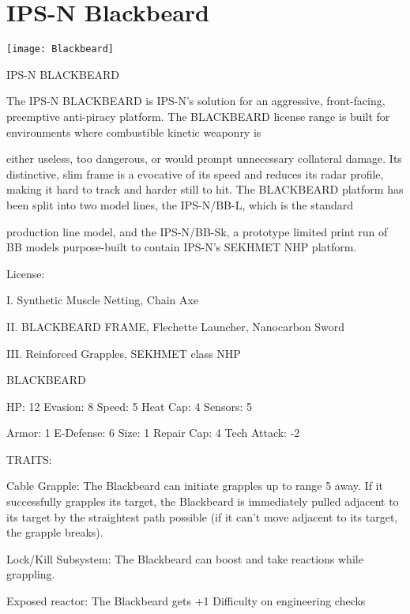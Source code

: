 \section{IPS-N Blackbeard}

\centering\texttt{[image: Blackbeard]}


                                         IPS-N BLACKBEARD


The IPS-N BLACKBEARD is IPS-N’s solution for an aggressive, front-facing, preemptive anti-piracy
platform. The BLACKBEARD license range is built for environments where combustible kinetic weaponry is

either useless, too dangerous, or would prompt unnecessary collateral damage. Its distinctive, slim frame is
a evocative of its speed and reduces its radar profile, making it hard to track and harder still to hit. The
BLACKBEARD platform has been split into two model lines, the IPS-N/BB-L, which is the standard

production line model, and the IPS-N/BB-Sk, a prototype limited print run of BB models purpose-built to
contain IPS-N’s SEKHMET NHP platform.

                                                     License:

I. Synthetic Muscle Netting, Chain Axe

II. BLACKBEARD FRAME, Flechette Launcher, Nanocarbon Sword

III. Reinforced Grapples, SEKHMET class NHP


                                                BLACKBEARD

  HP: 12          Evasion: 8                             Speed: 5            Heat Cap: 4        Sensors: 5

  Armor: 1        E-Defense: 6                           Size: 1             Repair Cap: 4      Tech Attack: -2

                                                     TRAITS:

  Cable Grapple: The Blackbeard can initiate grapples up to range 5 away. If it successfully grapples its
  target, the Blackbeard is immediately pulled adjacent to its target by the straightest path possible (if it
  can’t move adjacent to its target, the grapple breaks).

  Lock/Kill Subsystem: The Blackbeard can boost and take reactions while grappling.

  Exposed reactor: The Blackbeard gets +1 Difficulty on engineering checks

